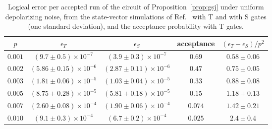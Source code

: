 \documentclass[aps,prl,reprint,twocolumn,amsmath,amssymb,floatfix,nofootinbib,superscriptaddress]{revtex4-2}
\theoremstyle{definition}
\theoremstyle{remark}
\begin{document}
\begin{table}[h]
\caption{Logical error per accepted run of the circuit of Proposition~\ref{prop:gsj} under uniform depolarizing noise, from the state-vector simulations of Ref.~\cite{gsjcode} with T and with S gates (one standard deviation), and the acceptance probability with T gates.}
\label{tab:gsjdata}
\begin{ruledtabular}
\begin{tabular}{ccccc}
$p$ & $\epsilon_T$ & $\epsilon_S$ & acceptance & $(\epsilon_T-\epsilon_S)/p^2$\\
\hline
$0.001$ & $(9.7\pm0.5)\times10^{-7}$ & $(3.9\pm0.3)\times10^{-7}$ & $0.69$ & $0.58\pm0.06$\\
$0.002$ & $(5.86\pm0.15)\times10^{-6}$ & $(2.87\pm0.11)\times10^{-6}$ & $0.47$ & $0.75\pm0.05$\\
$0.003$ & $(1.81\pm0.06)\times10^{-5}$ & $(1.03\pm0.04)\times10^{-5}$ & $0.33$ & $0.88\pm0.08$\\
$0.005$ & $(8.75\pm0.28)\times10^{-5}$ & $(5.81\pm0.18)\times10^{-5}$ & $0.15$ & $1.18\pm0.13$\\
$0.007$ & $(2.60\pm0.08)\times10^{-4}$ & $(1.90\pm0.06)\times10^{-4}$ & $0.074$ & $1.42\pm0.21$\\
$0.010$ & $(9.1\pm0.3)\times10^{-4}$ & $(6.7\pm0.2)\times10^{-4}$ & $0.025$ & $2.4\pm0.4$\\
\end{tabular}
\end{ruledtabular}
\end{table}
\end{document}
